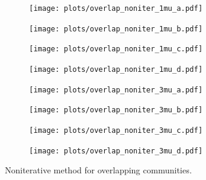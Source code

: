 \begin{figure}
    \centering
    \begin{subfigure}{0.5\textwidth}
    \texttt{[image: plots/overlap\_noniter\_1mu\_a.pdf]}
    \end{subfigure}%
    \begin{subfigure}{0.5\textwidth}
    \texttt{[image: plots/overlap\_noniter\_1mu\_b.pdf]}
    \end{subfigure}
    \begin{subfigure}{0.5\textwidth}
    \texttt{[image: plots/overlap\_noniter\_1mu\_c.pdf]}
    \end{subfigure}%
    \begin{subfigure}{0.5\textwidth}
    \texttt{[image: plots/overlap\_noniter\_1mu\_d.pdf]}
    \end{subfigure}
    \begin{subfigure}{0.5\textwidth}
    \texttt{[image: plots/overlap\_noniter\_3mu\_a.pdf]}
    \end{subfigure}%
    \begin{subfigure}{0.5\textwidth}
    \texttt{[image: plots/overlap\_noniter\_3mu\_b.pdf]}
    \end{subfigure}
    \begin{subfigure}{0.5\textwidth}
    \texttt{[image: plots/overlap\_noniter\_3mu\_c.pdf]}
    \end{subfigure}%
    \begin{subfigure}{0.5\textwidth}
    \texttt{[image: plots/overlap\_noniter\_3mu\_d.pdf]}
    \end{subfigure}
    \label{fig:no_iter_overlap}
    \caption{Noniterative method for overlapping communities.}
\end{figure}


